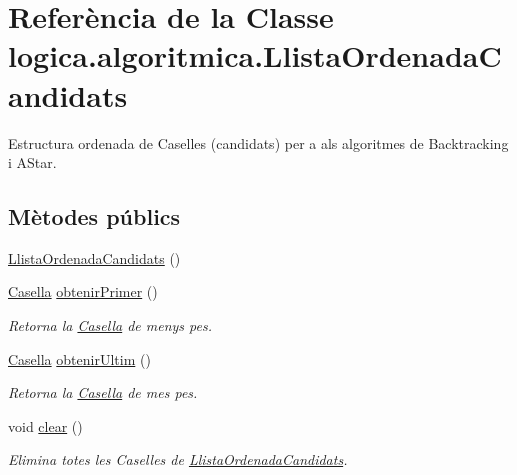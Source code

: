 \hypertarget{classlogica_1_1algoritmica_1_1_llista_ordenada_candidats}{\section{Referència de la Classe logica.\+algoritmica.\+Llista\+Ordenada\+Candidats}
\label{classlogica_1_1algoritmica_1_1_llista_ordenada_candidats}
}


Estructura ordenada de Caselles (candidats) per a als algoritmes de Backtracking i A\+Star.  


\subsection*{Mètodes públics}
\begin{DoxyCompactItemize}
\item 
\hyperlink{classlogica_1_1algoritmica_1_1_llista_ordenada_candidats_afad457a1d2c326f2b32e93bfae58fe58}{Llista\+Ordenada\+Candidats} ()
\item 
\hyperlink{classlogica_1_1algoritmica_1_1_casella}{Casella} \hyperlink{classlogica_1_1algoritmica_1_1_llista_ordenada_candidats_a8d69cb86084a5fcf7fda75e85bf6221d}{obtenir\+Primer} ()
\begin{DoxyCompactList}\small\item\em Retorna la \hyperlink{classlogica_1_1algoritmica_1_1_casella}{Casella} de menys pes. \end{DoxyCompactList}\item 
\hyperlink{classlogica_1_1algoritmica_1_1_casella}{Casella} \hyperlink{classlogica_1_1algoritmica_1_1_llista_ordenada_candidats_ad6cdf565555d27f8e5b50ae67bc66e16}{obtenir\+Ultim} ()
\begin{DoxyCompactList}\small\item\em Retorna la \hyperlink{classlogica_1_1algoritmica_1_1_casella}{Casella} de mes pes. \end{DoxyCompactList}\item 
void \hyperlink{classlogica_1_1algoritmica_1_1_llista_ordenada_candidats_a0d405bdd9cb347353e4e29c35e064d5d}{clear} ()
\begin{DoxyCompactList}\small\item\em Elimina totes les Caselles de \hyperlink{classlogica_1_1algoritmica_1_1_llista_ordenada_candidats}{Llista\+Ordenada\+Candidats}. \end{DoxyCompactList}\item 

\end{DoxyCompactItemize}
